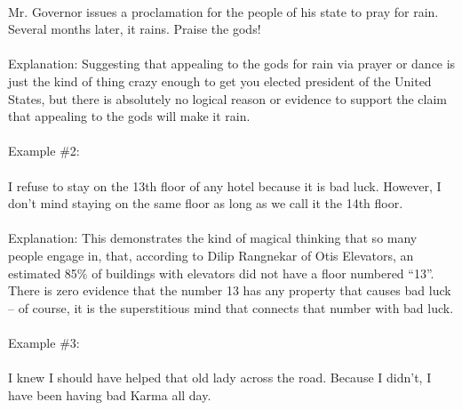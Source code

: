 \documentclass[a4paper,12pt,single,pdftex]{scrartcl}
\begin{document}
    \\

    
      Mr. Governor issues a proclamation for the people of his state to pray for rain.  Several months later, it rains.  Praise the gods!
    \\

    
      
    \\

    
      Explanation: Suggesting that appealing to the gods for rain via prayer or dance is just the kind of thing crazy enough to get you elected president of the United States, but there is absolutely no logical reason or evidence to support the claim that appealing to the gods will make it rain.
    \\

    
      
    \\

    
      Example \#2:
    \\

    
      
    \\

    
      I refuse to stay on the 13th floor of any hotel because it is bad luck.  However, I don’t mind staying on the same floor as long as we call it the 14th floor.
    \\

    
      
    \\

    
      Explanation: This demonstrates the kind of magical thinking that so many people engage in, that, according to Dilip Rangnekar of Otis Elevators, an estimated 85\% of buildings with elevators did not have a floor numbered “13”.  There is zero evidence that the number 13 has any property that causes bad luck -- of course, it is the superstitious mind that connects that number with bad luck.
    \\

    
      
    \\

    
      Example \#3:
    \\

    
      
    \\

    
      I knew I should have helped that old lady across the road.  Because I didn’t, I have been having bad Karma all day.
    \\
\end{document}
